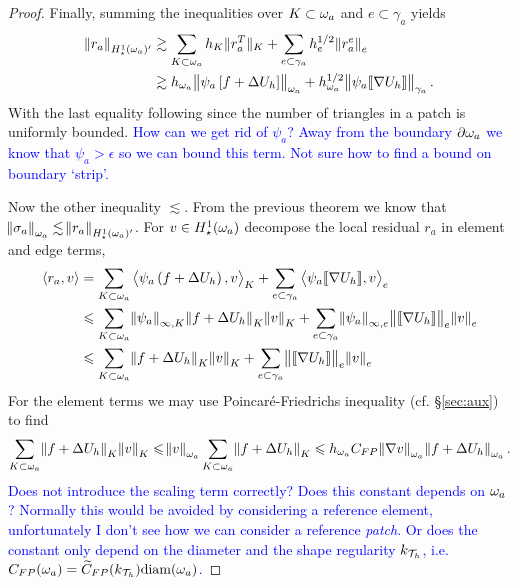 \documentclass[thesis.tex]{subfiles}
\begin{document}
\begin{proof}
  Finally, summing the inequalities over $K \subset \omega_a$ and $e \subset \gamma_a$ yields
  \begin{align*}
    \norm{r_a}_{H_\star^1(\omega_a)'} &\gtrsim \sum_{K \subset \omega_a} h_K \|{r^T_a}\|_K + \sum_{e \subset \gamma_a} h_e^{1/2} \norm{r^e_a}_e\\
    &\gtrsim h_{\omega_a} \norm{\psi_a \left[ f + \Delta U_h \right]}_{\omega_a} + h_{\omega_a}^{1/2} \norm{ \psi_a \llbracket \nabla U_h \rrbracket}_{\gamma_a}.
  \end{align*}
  With the last equality following since the number of triangles in a patch is uniformly bounded.
  \textcolor{blue}{How can we get rid of $\psi_a$? Away from the boundary $\partial \omega_a$ we know that $\psi_a > \epsilon$ so we can bound this term. Not sure how to find a bound on boundary `strip'.}


  Now the other inequality $\lesssim$. From the previous theorem we know that $\norm{\sigma_a}_{\omega_a} \lesssim \norm{r_a}_{H_\star^1(\omega_a)'}$. For $v \in H_\star^1(\omega_a)$ decompose the local residual $r_a$ in element and edge terms,
  \begin{align*}
    \left \langle r_a, v \right \rangle &= \sum_{K \subset \omega_a} \left \langle \psi_a\left(f + \Delta U_h\right), v \right \rangle_{K} + \sum_{e \subset \gamma_a} \left \langle \psi_a \llbracket \nabla U_h \rrbracket, v \right \rangle_e\\
    &\leqslant \sum_{K \subset \omega_a} \norm{\psi_a}_{\infty,K} \norm{f + \Delta U_h}_{K}\norm{v}_{K} + \sum_{e \subset \gamma_a} \norm{\psi_a}_{\infty, e} \norm{ \llbracket \nabla U_h \rrbracket}_e \norm{v}_e\\
    &\leqslant \sum_{K \subset \omega_a} \norm{f + \Delta U_h}_{K}\norm{v}_{K} + \sum_{e \subset \gamma_a} \norm{ \llbracket \nabla U_h \rrbracket}_e \norm{v}_e
  \end{align*}
  For the element terms we may use Poincar\'e-Friedrichs inequality (cf. \S\ref{sec:aux}) to find
  \[
    \sum_{K \subset \omega_a} \norm{f + \Delta U_h}_{K} \norm{v}_K \leqslant \norm{v}_{\omega_a} \sum_{K\subset \omega_a} \norm{f + \Delta U_h}_{K} \leqslant 
    h_{\omega_a} C_{FP} \norm{\nabla v}_{\omega_a} \norm{f + \Delta U_h}_{\omega_a}.
  \]
  \textcolor{blue}{Does not introduce the scaling term correctly? Does this constant depends on $\omega_a$? Normally this would be avoided
  by considering a reference element, unfortunately I don't see how we can consider a reference \emph{patch}.
  Or does the constant only depend on the diameter and the shape regularity $k_{\mathcal{T}_h}$,
  i.e. $C_{FP}(\omega_a) = \widetilde{C}_{FP}(k_{\mathcal{T}_h})\text{diam}(\omega_a)$.}


\end{proof}
\end{document}

